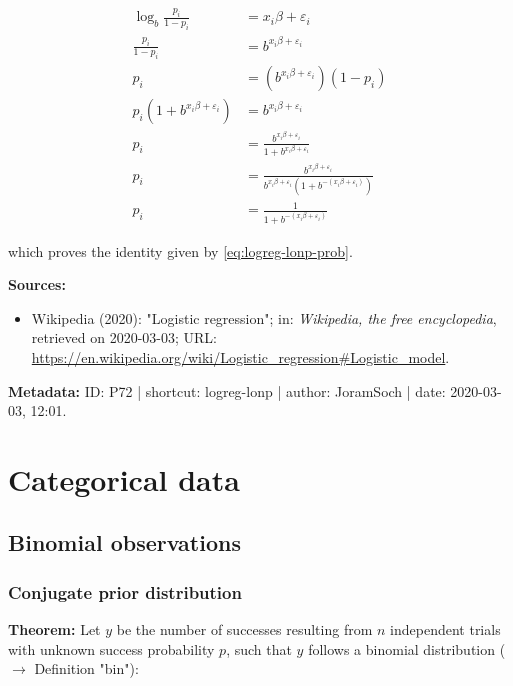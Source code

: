 \documentclass[a4paper,12pt]{book}
\begin{document}
\begin{equation} \label{eq:logreg-lonp-prob-qed}
\begin{split}
\log_b \frac{p_i}{1-p_i} &= x_i \beta + \varepsilon_i \\
\frac{p_i}{1-p_i} &= b^{x_i \beta + \varepsilon_i} \\
p_i &= \left( b^{x_i \beta + \varepsilon_i} \right) (1-p_i) \\
p_i \left( 1 + b^{x_i \beta + \varepsilon_i} \right) &= b^{x_i \beta + \varepsilon_i} \\
p_i &= \frac{b^{x_i \beta + \varepsilon_i}}{1 + b^{x_i \beta + \varepsilon_i}} \\
p_i &= \frac{b^{x_i \beta + \varepsilon_i}}{b^{x_i \beta + \varepsilon_i} \left( 1 + b^{-(x_i \beta + \varepsilon_i)} \right)} \\
p_i &= \frac{1}{1 + b^{-(x_i \beta + \varepsilon_i)}}
\end{split}
\end{equation}

which proves the identity given by \eqref{eq:logreg-lonp-prob}.

\vspace{1em}
\textbf{Sources:}
\begin{itemize}
\item Wikipedia (2020): "Logistic regression"; in: \textit{Wikipedia, the free encyclopedia}, retrieved on 2020-03-03; URL: \url{https://en.wikipedia.org/wiki/Logistic_regression#Logistic_model}.
\end{itemize}


\vspace{1em}
\textbf{Metadata:} ID: P72 | shortcut: logreg-lonp | author: JoramSoch | date: 2020-03-03, 12:01.


\pagebreak
\section{Categorical data}

\subsection{Binomial observations}

\subsubsection[\textbf{Conjugate prior distribution}]{Conjugate prior distribution} \label{sec:bin-prior}

\vspace{1em}
\textbf{Theorem:} Let $y$ be the number of successes resulting from $n$ independent trials with unknown success probability $p$, such that $y$ follows a binomial distribution ($\rightarrow$ Definition "bin"):
\end{document}
